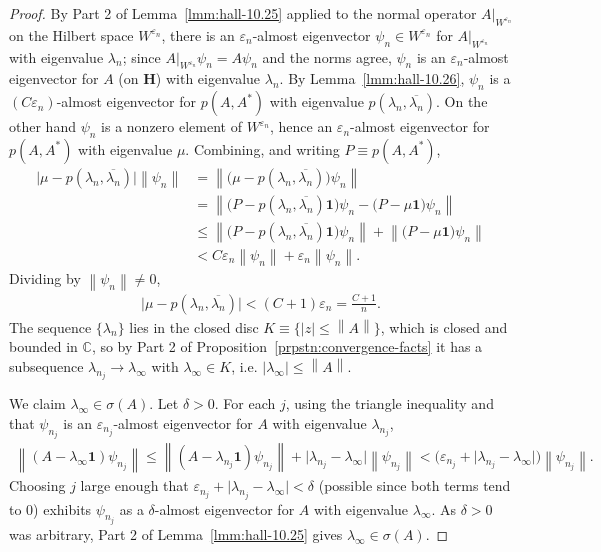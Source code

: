 \begin{proof}
By Part 2 of Lemma~\ref{lmm:hall-10.25} applied to the normal operator $A\vert_{W^{\varepsilon_n}}$ on the Hilbert space $W^{\varepsilon_n}$, there is an $\varepsilon_n$-almost eigenvector $\psi_n \in W^{\varepsilon_n}$ for $A\vert_{W^{\varepsilon_n}}$ with eigenvalue $\lambda_n$; since $A\vert_{W^{\varepsilon_n}}\psi_n = A\psi_n$ and the norms agree, $\psi_n$ is an $\varepsilon_n$-almost eigenvector for $A$ (on $\mathbf{H}$) with eigenvalue $\lambda_n$. By Lemma~\ref{lmm:hall-10.26}, $\psi_n$ is a $(C\varepsilon_n)$-almost eigenvector for $p(A,A^*)$ with eigenvalue $p(\lambda_n,\overline{\lambda_n})$. On the other hand $\psi_n$ is a nonzero element of $W^{\varepsilon_n}$, hence an $\varepsilon_n$-almost eigenvector for $p(A,A^*)$ with eigenvalue $\mu$. Combining, and writing $P \equiv p(A,A^*)$,
\begin{align}
    \big\lvert \mu - p(\lambda_n,\overline{\lambda_n}) \big\rvert \left\| \psi_n \right\|
        &= \left\| \big( \mu - p(\lambda_n,\overline{\lambda_n}) \big)\psi_n \right\| \\
        &= \left\| \big( P - p(\lambda_n,\overline{\lambda_n})\mathbf{1} \big)\psi_n - \big( P - \mu\mathbf{1} \big)\psi_n \right\| \\
        &\le \left\| \big( P - p(\lambda_n,\overline{\lambda_n})\mathbf{1} \big)\psi_n \right\| + \left\| \big( P - \mu\mathbf{1} \big)\psi_n \right\| \\
        &< C\varepsilon_n \left\| \psi_n \right\| + \varepsilon_n \left\| \psi_n \right\|.
\end{align}
Dividing by $\left\| \psi_n \right\| \ne 0$,
\begin{align}
    \big\lvert \mu - p(\lambda_n,\overline{\lambda_n}) \big\rvert < (C+1)\varepsilon_n = \frac{C+1}{n}. \tag{$\flat$}
\end{align}
The sequence $\{\lambda_n\}$ lies in the closed disc $K \equiv \{ \lvert z \rvert \le \left\| A \right\| \}$, which is closed and bounded in $\mathbb{C}$, so by Part 2 of Proposition~\ref{prpstn:convergence-facts} it has a subsequence $\lambda_{n_j} \to \lambda_\infty$ with $\lambda_\infty \in K$, i.e. $\lvert \lambda_\infty \rvert \le \left\| A \right\|$.

We claim $\lambda_\infty \in \sigma(A)$. Let $\delta > 0$. For each $j$, using the triangle inequality and that $\psi_{n_j}$ is an $\varepsilon_{n_j}$-almost eigenvector for $A$ with eigenvalue $\lambda_{n_j}$,
\begin{align}
    \left\| (A - \lambda_\infty\mathbf{1})\psi_{n_j} \right\|
      \le \left\| (A - \lambda_{n_j}\mathbf{1})\psi_{n_j} \right\| + \lvert \lambda_{n_j} - \lambda_\infty \rvert \left\| \psi_{n_j} \right\|
      < \big( \varepsilon_{n_j} + \lvert \lambda_{n_j} - \lambda_\infty \rvert \big) \left\| \psi_{n_j} \right\|.
\end{align}
Choosing $j$ large enough that $\varepsilon_{n_j} + \lvert \lambda_{n_j}-\lambda_\infty \rvert < \delta$ (possible since both terms tend to $0$) exhibits $\psi_{n_j}$ as a $\delta$-almost eigenvector for $A$ with eigenvalue $\lambda_\infty$. As $\delta>0$ was arbitrary, Part 2 of Lemma~\ref{lmm:hall-10.25} gives $\lambda_\infty \in \sigma(A)$.


\end{proof}
